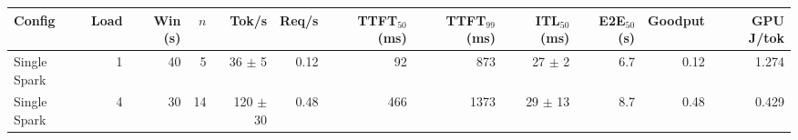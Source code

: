 \begin{tabular}{l r r r r r r r r r r r}
\toprule
Config & Load & Win (s) & $n$ & Tok/s & Req/s & TTFT$_{50}$ (ms) & TTFT$_{99}$ (ms) & ITL$_{50}$ (ms) & E2E$_{50}$ (s) & Goodput & GPU J/tok \\
\midrule
Single Spark & 1 & 40 & 5\rlap{$^\dagger$} & 36 $\pm$ 5 & 0.12 & 92 & 873 & 27 $\pm$ 2 & 6.7 & 0.12 & 1.274 \\
Single Spark & 4 & 30 & 14\rlap{$^\dagger$} & 120 $\pm$ 30 & 0.48 & 466 & 1373 & 29 $\pm$ 13 & 8.7 & 0.48 & 0.429 \\
\bottomrule
\end{tabular}
